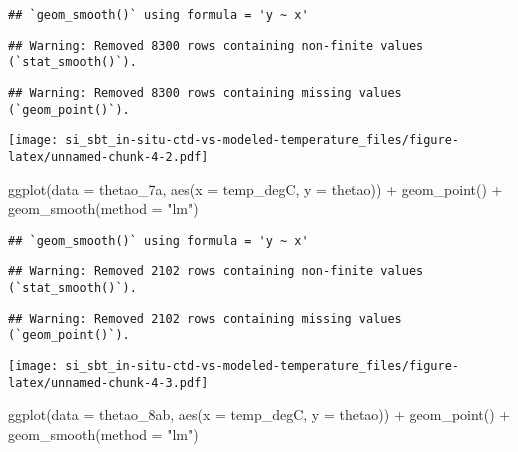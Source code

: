 \documentclass[
]{article}
\newenvironment{Shaded}{\begin{snugshade}}{\end{snugshade}}
\newcommand{\AttributeTok}[1]{\textcolor[rgb]{0.77,0.63,0.00}{#1}}
\newcommand{\FunctionTok}[1]{\textcolor[rgb]{0.00,0.00,0.00}{#1}}
\newcommand{\NormalTok}[1]{#1}
\newcommand{\SpecialCharTok}[1]{\textcolor[rgb]{0.00,0.00,0.00}{#1}}
\newcommand{\StringTok}[1]{\textcolor[rgb]{0.31,0.60,0.02}{#1}}
\begin{document}
\begin{verbatim}
## `geom_smooth()` using formula = 'y ~ x'
\end{verbatim}

\begin{verbatim}
## Warning: Removed 8300 rows containing non-finite values (`stat_smooth()`).
\end{verbatim}

\begin{verbatim}
## Warning: Removed 8300 rows containing missing values (`geom_point()`).
\end{verbatim}

\texttt{[image: si\_sbt\_in-situ-ctd-vs-modeled-temperature\_files/figure-latex/unnamed-chunk-4-2.pdf]}

\begin{Shaded}
\begin{Highlighting}[]
\FunctionTok{ggplot}\NormalTok{(}\AttributeTok{data =}\NormalTok{ thetao\_7a, }\FunctionTok{aes}\NormalTok{(}\AttributeTok{x =}\NormalTok{ temp\_degC, }\AttributeTok{y =}\NormalTok{ thetao)) }\SpecialCharTok{+} \FunctionTok{geom\_point}\NormalTok{() }\SpecialCharTok{+} \FunctionTok{geom\_smooth}\NormalTok{(}\AttributeTok{method =} \StringTok{"lm"}\NormalTok{)}
\end{Highlighting}
\end{Shaded}

\begin{verbatim}
## `geom_smooth()` using formula = 'y ~ x'
\end{verbatim}

\begin{verbatim}
## Warning: Removed 2102 rows containing non-finite values (`stat_smooth()`).
\end{verbatim}

\begin{verbatim}
## Warning: Removed 2102 rows containing missing values (`geom_point()`).
\end{verbatim}

\texttt{[image: si\_sbt\_in-situ-ctd-vs-modeled-temperature\_files/figure-latex/unnamed-chunk-4-3.pdf]}

\begin{Shaded}
\begin{Highlighting}[]
\FunctionTok{ggplot}\NormalTok{(}\AttributeTok{data =}\NormalTok{ thetao\_8ab, }\FunctionTok{aes}\NormalTok{(}\AttributeTok{x =}\NormalTok{ temp\_degC, }\AttributeTok{y =}\NormalTok{ thetao)) }\SpecialCharTok{+} \FunctionTok{geom\_point}\NormalTok{() }\SpecialCharTok{+} \FunctionTok{geom\_smooth}\NormalTok{(}\AttributeTok{method =} \StringTok{"lm"}\NormalTok{)}
\end{Highlighting}
\end{Shaded}
\end{document}
